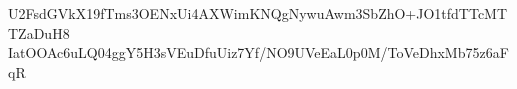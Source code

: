 U2FsdGVkX19fTms3OENxUi4AXWimKNQgNywuAwm3SbZhO+JO1tfdTTcMTTZaDuH8
IatOOAc6uLQ04ggY5H3sVEuDfuUiz7Yf/NO9UVeEaL0p0M/ToVeDhxMb75z6aFqR
